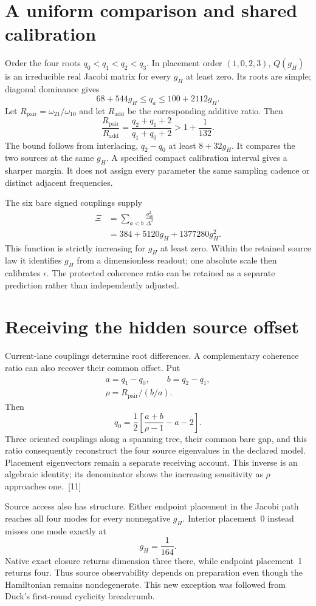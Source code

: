 \documentclass[10pt,twocolumn,letterpaper]{article}
\begin{document}
\section{A uniform comparison and shared calibration}
Order the four roots $q_0<q_1<q_2<q_3$. In placement order $(1,0,2,3)$, $Q(g_H)$ is an irreducible real Jacobi matrix for every $g_H$ at least zero. Its roots are simple; diagonal dominance gives
\[
68+544g_H\leq q_a\leq100+2112g_H.
\]
Let $R_{\mathrm{pair}}=\omega_{21}/\omega_{10}$ and let $R_{\mathrm{add}}$ be the corresponding additive ratio. Then
\[
\frac{R_{\mathrm{pair}}}{R_{\mathrm{add}}}=\frac{q_2+q_1+2}{q_1+q_0+2}>1+\frac{1}{132}.
\]
The bound follows from interlacing, $q_2-q_0$ at least $8+32g_H$. It compares the two sources at the same $g_H$. A specified compact calibration interval gives a sharper margin. It does not assign every parameter the same sampling cadence or distinct adjacent frequencies.

The six bare signed couplings supply
\[
\begin{aligned}
\Xi&=\sum_{a<b}\frac{g_{ab}^{2}}{\Delta^2}\\
&=384+5120g_H+1377280g_H^2.
\end{aligned}
\]
This function is strictly increasing for $g_H$ at least zero. Within the retained source law it identifies $g_H$ from a dimensionless readout; one absolute scale then calibrates $\epsilon$. The protected coherence ratio can be retained as a separate prediction rather than independently adjusted.

\section{Receiving the hidden source offset}
Current-lane couplings determine root differences. A complementary coherence ratio can also recover their common offset. Put
\[
\begin{gathered}
a=q_1-q_0,\qquad b=q_2-q_1,\\
\rho=R_{\mathrm{pair}}/(b/a).
\end{gathered}
\]
Then
\[
q_0=\frac12\left[\frac{a+b}{\rho-1}-a-2\right].
\]
Three oriented couplings along a spanning tree, their common bare gap, and this ratio consequently reconstruct the four source eigenvalues in the declared model. Placement eigenvectors remain a separate receiving account. This inverse is an algebraic identity; its denominator shows the increasing sensitivity as $\rho$ approaches one.~[11]

Source access also has structure. Either endpoint placement in the Jacobi path reaches all four modes for every nonnegative $g_H$. Interior placement~0 instead misses one mode exactly at
\[
g_H=\frac1{164}.
\]
Native exact closure returns dimension three there, while endpoint placement~1 returns four. Thus source observability depends on preparation even though the Hamiltonian remains nondegenerate. This new exception was followed from Duck's first-round cyclicity breadcrumb.
\end{document}
